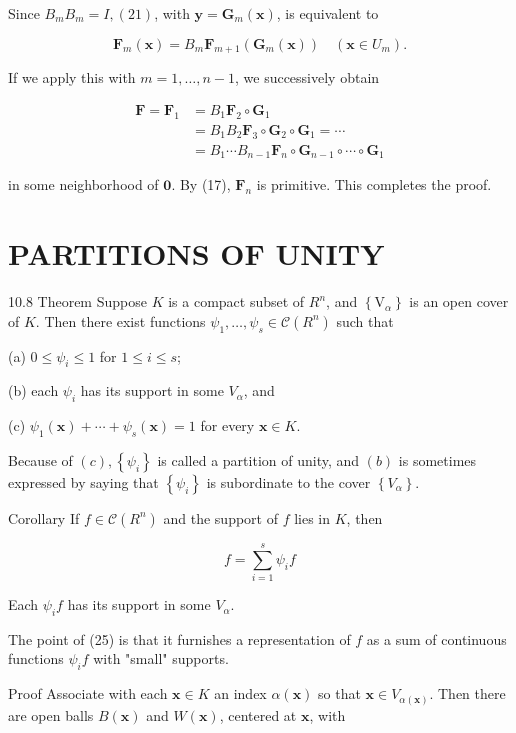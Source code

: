 \documentclass[10pt]{article}
\begin{document}
Since $B_{m} B_{m}=I,(21)$, with $\mathbf{y}=\mathbf{G}_{m}(\mathbf{x})$, is equivalent to

$$
\mathbf{F}_{m}(\mathbf{x})=B_{m} \mathbf{F}_{m+1}\left(\mathbf{G}_{m}(\mathbf{x})\right) \quad\left(\mathbf{x} \in U_{m}\right) .
$$

If we apply this with $m=1, \ldots, n-1$, we successively obtain

$$
\begin{aligned}
\mathbf{F}=\mathbf{F}_{1} & =B_{1} \mathbf{F}_{2} \circ \mathbf{G}_{1} \\
& =B_{1} B_{2} \mathbf{F}_{3} \circ \mathbf{G}_{2} \circ \mathbf{G}_{1}=\cdots \\
& =B_{1} \cdots B_{n-1} \mathbf{F}_{n} \circ \mathbf{G}_{n-1} \circ \cdots \circ \mathbf{G}_{1}
\end{aligned}
$$

in some neighborhood of $\mathbf{0}$. By (17), $\mathbf{F}_{n}$ is primitive. This completes the proof.

\section{PARTITIONS OF UNITY}
10.8 Theorem Suppose $K$ is a compact subset of $R^{n}$, and $\left\{\mathrm{V}_{\alpha}\right\}$ is an open cover of $K$. Then there exist functions $\psi_{1}, \ldots, \psi_{s} \in \mathscr{C}\left(R^{n}\right)$ such that

(a) $0 \leq \psi_{i} \leq 1$ for $1 \leq i \leq s$;

(b) each $\psi_{i}$ has its support in some $V_{\alpha}$, and

(c) $\psi_{1}(\mathbf{x})+\cdots+\psi_{s}(\mathbf{x})=1$ for every $\mathbf{x} \in K$.

Because of $(c),\left\{\psi_{i}\right\}$ is called a partition of unity, and $(b)$ is sometimes expressed by saying that $\left\{\psi_{i}\right\}$ is subordinate to the cover $\left\{V_{\alpha}\right\}$.

Corollary If $f \in \mathscr{C}\left(R^{n}\right)$ and the support of $f$ lies in $K$, then

$$
f=\sum_{i=1}^{s} \psi_{i} f
$$

Each $\psi_{i} f$ has its support in some $V_{\alpha}$.

The point of (25) is that it furnishes a representation of $f$ as a sum of continuous functions $\psi_{i} f$ with "small" supports.

Proof Associate with each $\mathbf{x} \in K$ an index $\alpha(\mathbf{x})$ so that $\mathbf{x} \in V_{\alpha(\mathbf{x})}$. Then there are open balls $B(\mathbf{x})$ and $W(\mathbf{x})$, centered at $\mathbf{x}$, with
\end{document}

